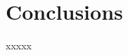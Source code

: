 \documentclass{aa}
\begin{document}
\section{Conclusions}
 \label{sec:conclusions}

 xxxxx









\end{document}
